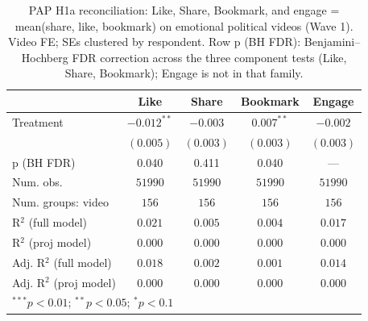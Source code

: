 
\begin{table}
\begin{center}
\begin{tabular}{l c c c c}
\hline
 & Like & Share & Bookmark & Engage \\
\hline
Treatment               & $-0.012^{**}$ & $-0.003$  & $0.007^{**}$ & $-0.002$  \\
                        & $(0.005)$     & $(0.003)$ & $(0.003)$    & $(0.003)$ \\
\hline
p (BH FDR)              & 0.040         & 0.411     & 0.040        & ---       \\
Num. obs.               & $51990$       & $51990$   & $51990$      & $51990$   \\
Num. groups: video      & $156$         & $156$     & $156$        & $156$     \\
R$^2$ (full model)      & $0.021$       & $0.005$   & $0.004$      & $0.017$   \\
R$^2$ (proj model)      & $0.000$       & $0.000$   & $0.000$      & $0.000$   \\
Adj. R$^2$ (full model) & $0.018$       & $0.002$   & $0.001$      & $0.014$   \\
Adj. R$^2$ (proj model) & $0.000$       & $0.000$   & $0.000$      & $0.000$   \\
\hline
\multicolumn{5}{l}{\scriptsize{$^{***}p<0.01$; $^{**}p<0.05$; $^{*}p<0.1$}}
\end{tabular}
\caption{PAP H1a reconciliation: Like, Share, Bookmark, and engage = mean(share, like, bookmark) on emotional political videos (Wave 1). Video FE; SEs clustered by respondent. Row p (BH FDR): Benjamini--Hochberg FDR correction across the three component tests (Like, Share, Bookmark); Engage is not in that family.}
\label{tab:pap_h1a_engage_emotional}
\end{center}
\end{table}
